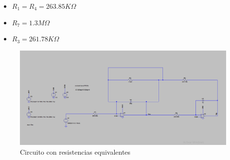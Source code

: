 \documentclass[12pt]{article}
\begin{document}
    \begin{itemize}
      \item $R_1 = R_4 = 263.85K\Omega $
      \item $R_7 = 1.3 M\Omega$
      \item $R_3 = 261.78K\Omega$
    \end{itemize}

    \begin{figure}[H]
      \centering
      \includegraphics[width=1\linewidth]{Img/img_9.PNG}
      \caption{Circuito con resistencias equivalentes}%
      \label{fig:img9}
    \end{figure}
 
\end{document}
